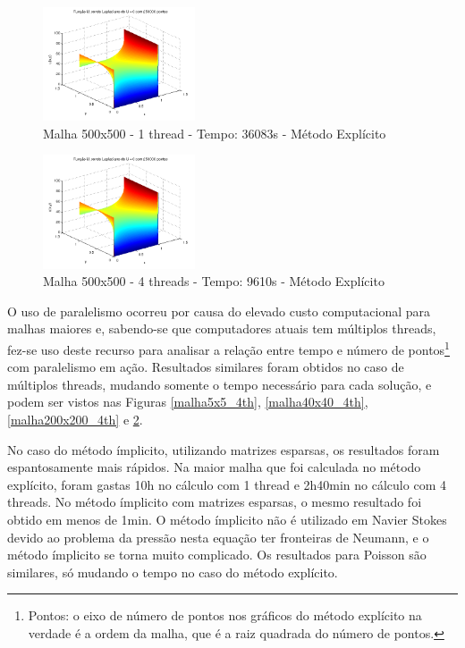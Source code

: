 \documentclass[journal]{IEEEtran}
\begin{document}
\begin{figure}[ht!]

\centering
\includegraphics[width = 0.4\textwidth]{figures/problema01_m1/06.png}
\caption{Malha 500x500 - 1 thread - Tempo: 36083s - Método Explícito\label{malha500x500_1th}}
\end{figure}

\begin{figure}[ht!]

\centering
\includegraphics[width = 0.4\textwidth]{figures/problema01_m1/15.png}
\caption{Malha 500x500 - 4 threads - Tempo: 9610s - Método Explícito\label{malha500x500_4th}}
\end{figure}

O uso de paralelismo ocorreu por causa do elevado custo computacional para malhas maiores e, sabendo-se que computadores atuais tem múltiplos threads, fez-se uso deste recurso para analisar a relação entre tempo e número de pontos\footnote{Pontos: o eixo de número de pontos nos gráficos do método explícito na verdade é a ordem da malha, que é a raiz quadrada do número de pontos.} com paralelismo em ação. Resultados similares foram obtidos no caso de múltiplos threads, mudando somente o tempo necessário para cada solução, e podem ser vistos nas Figuras \ref{malha5x5_4th}, \ref{malha40x40_4th}, \ref{malha200x200_4th} e \ref{malha500x500_4th}.

No caso do método ímplicito, utilizando matrizes esparsas, os resultados foram espantosamente mais rápidos. Na maior malha que foi calculada no método explícito, foram gastas 10h no cálculo com 1 thread e 2h40min no cálculo com 4 threads. No método ímplicito com matrizes esparsas, o mesmo resultado foi obtido em menos de 1min. O método ímplicito não é utilizado em Navier Stokes devido ao problema da pressão nesta equação ter fronteiras de Neumann, e o método ímplicito se torna muito complicado. Os resultados para Poisson são similares, só mudando o tempo no caso do método explícito.
\end{document}
